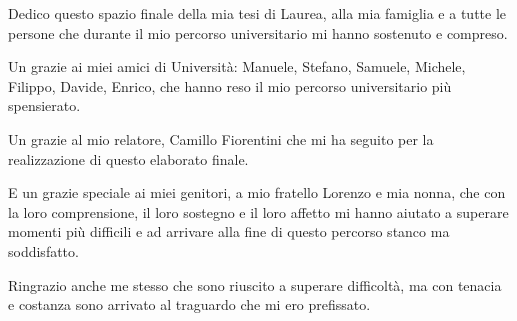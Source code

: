 \documentclass[a4paper,12pt]{report}
\begin{document}
%
%
Dedico questo spazio finale della mia tesi di Laurea, alla mia famiglia e a tutte le persone che durante il mio percorso universitario mi hanno sostenuto e compreso.

Un grazie ai miei amici di Università: Manuele, Stefano, Samuele, Michele, Filippo, Davide, Enrico, che hanno reso il mio percorso universitario più spensierato.

Un grazie al mio relatore, Camillo Fiorentini che mi ha seguito per la realizzazione di questo elaborato finale.

E un grazie speciale ai miei genitori, a mio fratello Lorenzo e mia nonna, che con la loro comprensione, il loro sostegno e il loro affetto mi hanno aiutato a superare momenti più difficili e ad arrivare alla fine di questo percorso stanco ma soddisfatto.

Ringrazio anche me stesso che sono riuscito a superare difficoltà, ma con tenacia e costanza sono arrivato al traguardo che mi ero prefissato.
\end{document}
